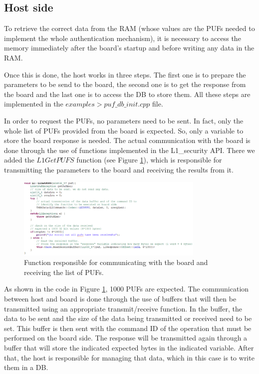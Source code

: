 \subsection{Host side}

To retrieve the correct data from the RAM (whose values are the PUFs needed to implement the whole authentication mechanism), it is necessary to access the memory immediately after the board's startup and before writing any data in the RAM. 

Once this is done, the host works in three steps. The first one is to prepare the parameters to be send to the board, the second one is to get the response from the board and the last one is to access the DB to store them. All these steps are implemented in the $examples > puf\_db\_init.cpp$ file.

In order to request the PUFs, no parameters need to be sent. In fact, only the whole list of PUFs provided from the board is expected. So, only a variable to store the board response is needed.
The actual communication with the board is done through the use of functions implemented in the L1\_security API. There we added the $L1GetPUFS$ function (see Figure \ref{fig:L1GetPUFS}), which is responsible for transmitting the parameters to the board and receiving the results from it.

\begin{figure}[h!]
	\vspace{0.5cm}
	\includegraphics[width = 0.8\textwidth]{images/L1GetPUFS.png}
	\caption{Function responsible for communicating with the board and receiving the list of PUFs. }
	\label{fig:L1GetPUFS}
\end{figure}

As shown in the code in Figure \ref{fig:L1GetPUFS}, 1000 PUFs are expected. The communication between host and board is done through the use of buffers that will then be transmitted using an appropriate transmit/receive function. In the buffer, the data to be sent and the size of the data being transmitted or received need to be set. This buffer is then sent with the command ID of the operation that must be performed on the board side. The response will be transmitted again through a buffer that will store the indicated expected bytes in the indicated variable. After that, the host is responsible for managing that data, which in this case is to write them in a DB.

